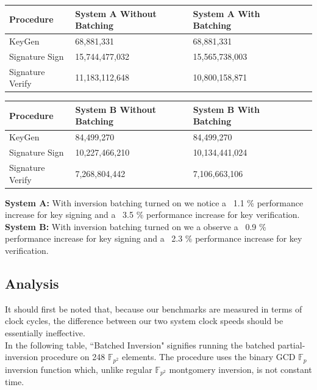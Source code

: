 \begin{center}
\begin{tabular}{@{}lllll@{}}
	\toprule
	Procedure & System A Without Batching & System A With Batching\\
	\midrule
	KeyGen & 68,881,331 & 68,881,331\\
	Signature Sign & 15,744,477,032 & 15,565,738,003\\
	Signature Verify & 11,183,112,648 & 10,800,158,871\\
	\bottomrule
\end{tabular}
\end{center}

\begin{center}
\begin{tabular}{@{}lllll@{}}
	\toprule
	Procedure & System B Without Batching & System B With Batching\\
	\midrule
	KeyGen & 84,499,270 & 84,499,270\\
	Signature Sign & 10,227,466,210 & 10,134,441,024\\
	Signature Verify & 7,268,804,442 & 7,106,663,106\\
	\bottomrule
\end{tabular}
\end{center}

\textbf{System A:} With inversion batching turned on we notice a ~1.1 \% performance increase for key signing and a ~3.5 \% performance increase for key verification.\\

\textbf{System B:} With inversion batching turned on we a observe a ~0.9 \% performance increase for key signing and a ~2.3 \% performance increase for key verification.\\

\subsection{Analysis}

It should first be noted that, because our benchmarks are measured in terms of clock cycles, the difference between our two system clock speeds should be essentially ineffective. \\

In the following table, ``Batched Inversion" signifies running the batched partial-inversion procedure on 248 $\mathbb{F}_{p^{2}}$ elements. The procedure uses the binary GCD $\mathbb{F}_{p}$ inversion function which, unlike regular $\mathbb{F}_{p^{2}}$ montgomery inversion, is not constant time.\\

